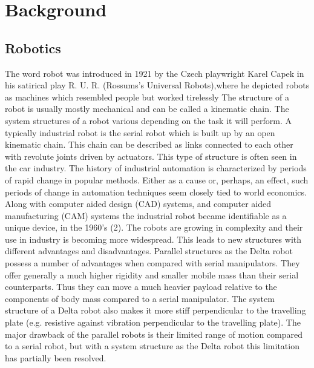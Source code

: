\makeatletter
\def\maxwidth#1{\ifdim\Gin@nat@width>#1 #1\else\Gin@nat@width\fi}
\makeatother

\chapter{Background}
\section{Robotics}
The word robot was introduced in 1921 by the Czech playwright Karel Capek in his satirical play R. U. R. (Rossums’s Universal Robots),where he depicted robots as machines which resembled people but worked tirelessly The structure of a robot is usually mostly mechanical and can be called a kinematic chain. The system structures of a robot various depending on the task it will perform. A typically industrial robot is the serial robot which is built up by an open kinematic chain. This chain can be described as links connected to each other with revolute joints driven by actuators. This type of structure is often seen in the car industry.
The history of industrial automation is characterized by periods of rapid change in popular methods. Either as a cause or, perhaps, an effect, such periods of change in automation techniques seem closely tied to world economics. Along with computer aided design (CAD) systems, and computer aided manufacturing (CAM) systems the industrial robot became identifiable as a unique device, in the 1960’s (2). The robots are growing in complexity and their use in industry is becoming more widespread. This leads to new structures with different advantages and disadvantages.
Parallel structures as the Delta robot possess a number of advantages when compared with serial manipulators. They offer generally a much higher rigidity and smaller mobile mass than their serial counterparts. Thus they can move a much heavier payload relative to the components of body mass compared to a serial manipulator. The system structure of a Delta robot also makes it more stiff perpendicular to the travelling plate (e.g. resistive against vibration perpendicular to the travelling plate). The major drawback of the parallel robots is their limited range of motion compared to a serial robot, but with a system structure as the Delta robot this limitation has partially been resolved.

